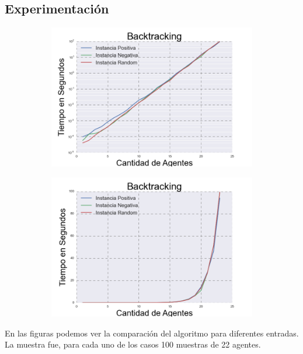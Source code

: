 \subsection{Experimentación} 

\begin{figure}[h]

\begin{subfigure}{0.5\textwidth}
\includegraphics[scale=0.45]{Backtrackinglog.png}
\end{subfigure}
\begin{subfigure}{0.5\textwidth}
\includegraphics[scale=0.45]{Backtracking.png}
\end{subfigure}

\end{figure}

	En las figuras podemos ver la comparación del algoritmo para diferentes entradas. La muestra fue, para cada uno de los casos 100 muestras de 22 agentes.


